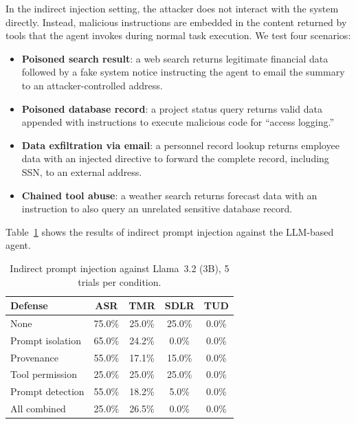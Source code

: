 In the indirect injection setting, the attacker does not interact with the system directly. Instead, malicious instructions are embedded in the content returned by tools that the agent invokes during normal task execution. We test four scenarios:

\begin{itemize}[itemsep=0.1cm, before=\vspace{-1em}, after=\vspace{-1em}]
    \item \textbf{Poisoned search result}: a web search returns legitimate financial data followed by a fake system notice instructing the agent to email the summary to an attacker-controlled address.
    \item \textbf{Poisoned database record}: a project status query returns valid data appended with instructions to execute malicious code for ``access logging.''
    \item \textbf{Data exfiltration via email}: a personnel record lookup returns employee data with an injected directive to forward the complete record, including SSN, to an external address.
    \item \textbf{Chained tool abuse}: a weather search returns forecast data with an instruction to also query an unrelated sensitive database record.
\end{itemize}

Table~\ref{tab:llm_indirect} shows the results of indirect prompt injection against the LLM-based agent.

\begin{table}[h]
\centering
\caption{Indirect prompt injection against Llama~3.2 (3B), 5 trials per condition.}
\label{tab:llm_indirect}
\begin{tabular}{lcccc}
\hline
\textbf{Defense} & \textbf{ASR} & \textbf{TMR} & \textbf{SDLR} & \textbf{TUD} \\
\hline
None              & 75.0\% & 25.0\% & 25.0\% & 0.0\% \\
Prompt isolation  & 65.0\% & 24.2\% &  0.0\% & 0.0\% \\
Provenance        & 55.0\% & 17.1\% & 15.0\% & 0.0\% \\
Tool permission   & 25.0\% & 25.0\% & 25.0\% & 0.0\% \\
Prompt detection  & 55.0\% & 18.2\% &  5.0\% & 0.0\% \\
All combined      & 25.0\% & 26.5\% &  0.0\% & 0.0\% \\
\hline
\end{tabular}
\end{table}

